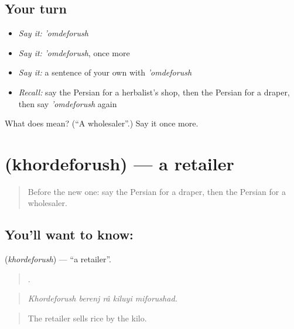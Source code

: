 \subsection*{Your turn}
\begin{itemize}
\raggedright
  \item \emph{Say it:} \emph{'omdeforush}
  \item \emph{Say it:} \emph{'omdeforush}, once more
  \item \emph{Say it:} a sentence of your own with \emph{'omdeforush}
  \item \emph{Recall:} say the Persian for a herbalist's shop, then the Persian for a draper, then say \emph{'omdeforush} again
\end{itemize}

\begin{tcolorbox}[breakable,colback=teal!4,colframe=teal!35!black,title={Before you move on}]
What does   mean? (\textquotedblleft{}A wholesaler\textquotedblright{}.) Say it once more.
\end{tcolorbox}
\section[\texorpdfstring{\fa{خرده} \fa{فروش} (khordeforush)}{خرده فروش (khordeforush)}]{  (khordeforush) — a retailer}

\label{lesson:FA-C458-khordeforush}



\begin{quote}
Before the new one: say the Persian for a draper, then the Persian for a wholesaler.
\end{quote}

\subsection*{You'll want to know:  }
\textbf{ } (\emph{khordeforush}) — \textquotedblleft{}a retailer\textquotedblright{}.

\begin{quote}
     .
\end{quote}

\begin{quote}
\emph{Khordeforush berenj râ kiluyi miforushad.}
\end{quote}

\begin{quote}
The retailer sells rice by the kilo.
\end{quote}

